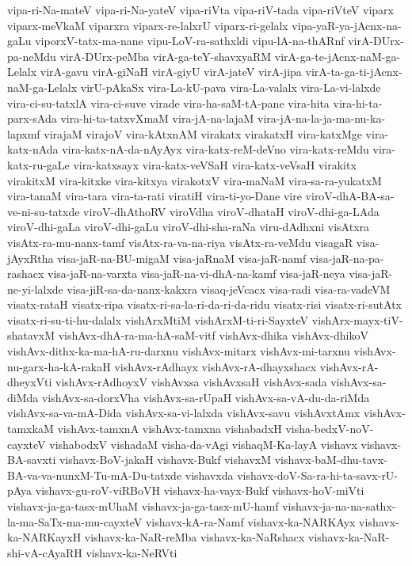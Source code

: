 {vipa-ri-Na-mateV
vipa-ri-Na-yateV
vipa-riVta
vipa-riV-tada
vipa-riVteV
viparx
viparx-meVkaM
viparxra
viparx-re-lalxrU
viparx-ri-gelalx
vipa-yaR-ya-jAcnx-na-gaLu
viporxV-tatx-ma-nane
vipu-LoV-ra-sathxldi
vipu-lA-na-thARnf
virA-DUrx-pa-neMdu
virA-DUrx-peMba
virA-ga-teY-shavxyaRM
virA-ga-te-jAcnx-naM-ga-Lelalx
virA-gavu
virA-giNaH
virA-giyU
virA-jateV
virA-jipa
virA-ta-ga-ti-jAcnx-naM-ga-Lelalx
virU-pAkaSx
vira-La-kU-pava
vira-La-valalx
vira-La-vi-lalxde
vira-ci-su-tatxlA
vira-ci-suve
virade
vira-ha-saM-tA-pane
vira-hita
vira-hi-ta-parx-sAda
vira-hi-ta-tatxvXmaM
vira-jA-na-lajaM
vira-jA-na-la-ja-ma-nu-ka-lapxmf
virajaM
virajoV
vira-kAtxnAM
virakatx
virakatxH
vira-katxMge
vira-katx-nAda
vira-katx-nA-da-nAyAyx
vira-katx-reM-deVno
vira-katx-reMdu
vira-katx-ru-gaLe
vira-katxsayx
vira-katx-veVSaH
vira-katx-veVsaH
virakitx
virakitxM
vira-kitxke
vira-kitxya
virakotxV
vira-maNaM
vira-sa-ra-yukatxM
vira-tanaM
vira-tara
vira-ta-rati
viratiH
vira-ti-yo-Dane
vire
viroV-dhA-BA-sa-ve-ni-su-tatxde
viroV-dhAthoRV
viroVdha
viroV-dhataH
viroV-dhi-ga-LAda
viroV-dhi-gaLa
viroV-dhi-gaLu
viroV-dhi-sha-raNa
viru-dAdhxni
visAtxra
visAtx-ra-mu-nanx-tamf
visAtx-ra-va-na-riya
visAtx-ra-veMdu
visagaR
visa-jAyxRtha
visa-jaR-na-BU-migaM
visa-jaRnaM
visa-jaR-namf
visa-jaR-na-pa-rashacx
visa-jaR-na-varxta
visa-jaR-na-vi-dhA-na-kamf
visa-jaR-neya
visa-jaR-ne-yi-lalxde
visa-jiR-sa-da-nanx-kakxra
visaq-jeVcacx
visa-radi
visa-ra-vadeVM
visatx-rataH
visatx-ripa
visatx-ri-sa-la-ri-da-ri-da-ridu
visatx-risi
visatx-ri-sutAtx
visatx-ri-su-ti-hu-dalalx
vishArxMtiM
vishArxM-ti-ri-SayxteV
vishArx-mayx-tiV-shatavxM
vishAvx-dhA-ra-ma-hA-saM-vitf
vishAvx-dhika
vishAvx-dhikoV
vishAvx-dithx-ka-ma-hA-ru-darxnu
vishAvx-mitarx
vishAvx-mi-tarxnu
vishAvx-nu-garx-ha-kA-rakaH
vishAvx-rAdhayx
vishAvx-rA-dhayxshacx
vishAvx-rA-dheyxVti
vishAvx-rAdhoyxV
vishAvxsa
vishAvxsaH
vishAvx-sada
vishAvx-sa-diMda
vishAvx-sa-dorxVha
vishAvx-sa-rUpaH
vishAvx-sa-vA-du-da-riMda
vishAvx-sa-va-mA-Dida
vishAvx-sa-vi-lalxda
vishAvx-savu
vishAvxtAmx
vishAvx-tamxkaM
vishAvx-tamxnA
vishAvx-tamxna
vishabadxH
visha-bedxV-noV-cayxteV
vishabodxV
vishadaM
visha-da-vAgi
vishaqM-Ka-layA
vishavx
vishavx-BA-savxti
vishavx-BoV-jakaH
vishavx-Bukf
vishavxM
vishavx-baM-dhu-tavx-BA-va-va-nunxM-Tu-mA-Du-tatxde
vishavxda
vishavx-doV-Sa-ra-hi-ta-savx-rU-pAya
vishavx-gu-roV-viRBoVH
vishavx-ha-vayx-Bukf
vishavx-hoV-miVti
vishavx-ja-ga-tasx-mUhaM
vishavx-ja-ga-tasx-mU-hamf
vishavx-ja-na-na-sathx-la-ma-SaTx-ma-mu-cayxteV
vishavx-kA-ra-Namf
vishavx-ka-NARKAyx
vishavx-ka-NARKayxH
vishavx-ka-NaR-reMba
vishavx-ka-NaRshacx
vishavx-ka-NaR-shi-vA-cAyaRH
vishavx-ka-NeRVti
}
